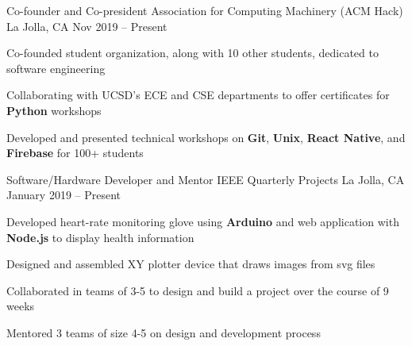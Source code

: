 \documentclass[]{awesome-cv}
\begin{document}
\vspace{-5mm}
\begin{cventries}
  \vspace{-1mm}
	\cventry
  {Co-founder and Co-president}
  {Association for Computing Machinery (ACM Hack)}
	{La Jolla, CA}
  {Nov 2019 – Present}
	{\begin{cvitems}
    \item {Co-founded student organization, along with 10 other students,
      dedicated to software engineering}
    \item {Collaborating with UCSD's ECE and CSE departments to offer certificates
      for \textbf{Python} workshops}
    \item {Developed and presented technical workshops on \textbf{Git}, \textbf{Unix},
        \textbf{React Native}, and \textbf{Firebase} for 100+ students}
		\end{cvitems}}

	\vspace{-3mm}
	\cventry
  {Software/Hardware Developer and  Mentor}
	{IEEE Quarterly Projects}
	{La Jolla, CA}
  {January 2019 – Present}
	{\begin{cvitems}
    \item {Developed heart-rate monitoring glove using \textbf{Arduino} and
      web application with \textbf{Node.js} to display health information}
    \item {Designed and assembled XY plotter device that draws images from svg
      files}
    \item {Collaborated in teams of 3-5 to design and build a project over the
      course of 9 weeks}
    \item {Mentored 3 teams of size 4-5 on design and development process}
		\end{cvitems}}



\end{cventries}
\end{document}

